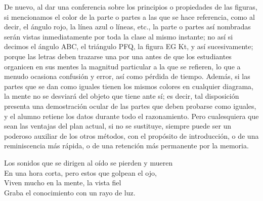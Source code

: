 \documentclass[booklanguage=english]{byrnebook}
\begin{document}
De nuevo, al dar una conferencia sobre los principios o propiedades de las figuras, si mencionamos el color de la parte o partes a las que se hace referencia, como al decir, el ángulo rojo, la línea azul o líneas, etc., la parte o partes así nombradas serán vistas inmediatamente por toda la clase al mismo instante; no así si decimos el ángulo ABC, el triángulo PFQ, la figura EG Kt, y así sucesivamente; porque las letras deben trazarse una por una antes de que los estudiantes organicen en sus mentes la magnitud particular a la que se refieren, lo que a menudo ocasiona confusión y error, así como pérdida de tiempo. Además, si las partes que se dan como iguales tienen los mismos colores en cualquier diagrama, la mente no se desviará del objeto que tiene ante sí; es decir, tal disposición presenta una demostración ocular de las partes que deben probarse como iguales, y el alumno retiene los datos durante todo el razonamiento. Pero cualesquiera que sean las ventajas del plan actual, si no se sustituye, siempre puede ser un poderoso auxiliar de los otros métodos, con el propósito de introducción, o de una reminiscencia más rápida, o de una retención más permanente por la memoria.


\baselineskip

\begin{center} %
Los sonidos que se dirigen al oído se pierden y mueren\\
En una hora corta, pero estos que golpean el ojo,\\
Viven mucho en la mente, la vista fiel\\
Graba el conocimiento con un rayo de luz.
\end{center}
\end{document}
